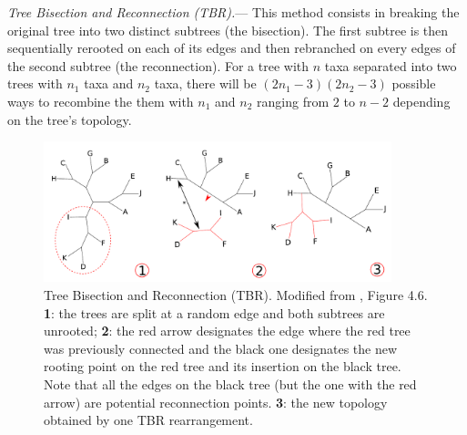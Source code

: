 \documentclass[12pt,letterpaper]{article}
\renewcommand{\subsubsection}[1]{%
\vspace{2ex}
\noindent
\textit{#1.}---}
\begin{document}
\subsubsection{Tree Bisection and Reconnection (TBR)}
This method consists in breaking the original tree into two distinct subtrees (the bisection).
The first subtree is then sequentially rerooted on each of its edges and then rebranched on every edges of the second subtree (the reconnection).
For a tree with $n$ taxa separated into two trees with $n_{1}$ taxa and $n_{2}$ taxa, there will be $(2n_{1}-3)(2n_{2}-3)$ possible ways to recombine the them \citep{felsenstein2004inferring} with $n_{1}$ and $n_{2}$ ranging from $2$ to $n-2$ depending on the tree's topology.


\begin{figure}[!htbp]
\centering
   \includegraphics[width=0.9\textwidth]{Figure/TBR.pdf}
\caption{Tree Bisection and Reconnection (TBR). Modified from \cite{felsenstein2004inferring}, Figure 4.6. \textbf{1}: the trees are split at a random edge and both subtrees are unrooted; \textbf{2}: the red arrow designates the edge where the red tree was previously connected and the black one designates the new rooting point on the red tree and its insertion on the black tree. Note that all the edges on the black tree (but the one with the red arrow) are potential reconnection points. \textbf{3}: the new topology obtained by one TBR rearrangement.}
\label{Figure_TBR}
\end{figure}
\end{document}
